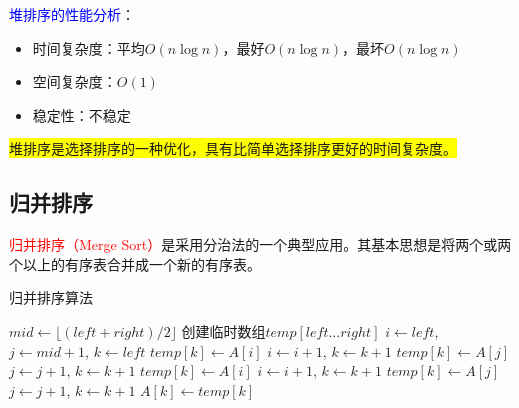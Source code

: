 \documentclass{../../note}
\begin{document}
\textcolor{blue}{堆排序的性能分析}：
\begin{itemize}
  \item 时间复杂度：平均$O(n\log{n})$，最好$O(n\log{n})$，最坏$O(n\log{n})$
  \item 空间复杂度：$O(1)$
  \item 稳定性：不稳定
\end{itemize}

\colorbox{yellow}{堆排序是选择排序的一种优化，具有比简单选择排序更好的时间复杂度。}

\subsection{归并排序}

\textcolor{red}{归并排序（Merge Sort）}是采用分治法的一个典型应用。其基本思想是将两个或两个以上的有序表合并成一个新的有序表。

\begin{algorithm}
  \caption{归并排序算法}
  \begin{algorithmic}[1]
    \State $mid \gets \lfloor (left + right) / 2 \rfloor$
    \State {}
    \State {}
    \State {}
    \EndIf
    \EndProcedure
    \State
    \State 创建临时数组$temp[left...right]$
    \State $i \gets left$, $j \gets mid+1$, $k \gets left$
    \State $temp[k] \gets A[i]$
    \State $i \gets i + 1$, $k \gets k + 1$
    \Else
    \State $temp[k] \gets A[j]$
    \State $j \gets j + 1$, $k \gets k + 1$
    \EndIf
    \EndWhile
     
    \State $temp[k] \gets A[i]$
    \State $i \gets i + 1$, $k \gets k + 1$
    \EndWhile
     
    \State $temp[k] \gets A[j]$
    \State $j \gets j + 1$, $k \gets k + 1$
    \EndWhile
     
    \State $A[k] \gets temp[k]$
    \EndFor
    \EndProcedure
  \end{algorithmic}
\end{algorithm}
\end{document}
